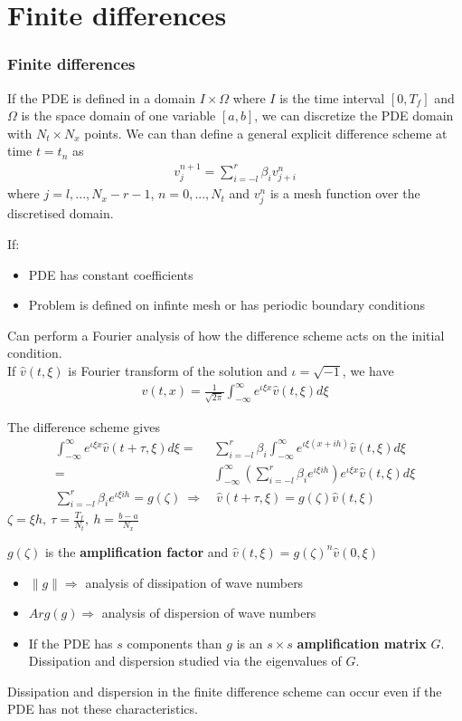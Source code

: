 \documentclass{beamer}
\begin{document}
\section{Finite differences}
\begin{frame}
\frametitle{Finite differences}
If the PDE is defined in a domain $I \times \Omega$ where $I$ is the time interval $[0, T_f]$ and $\Omega$ is the space domain of one variable $[a,b]$, we can discretize the PDE domain with $N_t \times N_x$ points. We can than define a general explicit difference scheme at time $t = t_n$ as
\begin{align*}
v_j^{n+1} = \sum_{i = -l}^r \beta_i v_{j+i}^n
\end{align*}
where $j = l, ..., N_x - r -1$, $n = 0, ..., N_t$ and $v_j^n$ is a mesh function over the discretised domain.
\end{frame}
\begin{frame}
If: \begin{itemize}
\item PDE has constant coefficients
\item Problem is defined on infinte mesh or has periodic boundary conditions
\end{itemize}
Can perform a Fourier analysis of how the difference scheme acts on the initial condition. \\ If $\hat{v}(t,\xi)$ is Fourier transform of the solution and $\iota = \sqrt{-1}$, we have
\begin{align*}
v(t,x) = \frac{1}{\sqrt{2\pi}}\int_{-\infty}^{\infty}e^{\iota\xi x}\hat{v}(t,\xi)d\xi
\end{align*}
\end{frame}
\begin{frame}
The difference scheme gives
\begin{align*}
\int_{-\infty}^{\infty}e^{\iota\xi x}\hat{v}(t + \tau,\xi)d\xi = & \sum_{i=-l}^{r}\beta_i\int_{-\infty}^{\infty}e^{\iota\xi (x + ih)}\hat{v}(t,\xi)d\xi \\
= & \int_{-\infty}^{\infty} \left(\sum_{i=-l}^{r}\beta_i e^{\iota\xi ih}\right) e^{\iota \xi x}\hat{v}(t,\xi)d\xi \\
\sum_{i=-l}^{r}\beta_i e^{\iota\xi ih} = g(\zeta) \ \Rightarrow & \ \hat{v}(t + \tau, \xi) = g(\zeta)\hat{v}(t,\xi)
\end{align*}
$\zeta = \xi h, \ \tau = \frac{T_f}{N_t}, \ h = \frac{b - a}{N_x}$
\end{frame}
\begin{frame}
$g(\zeta)$ is the \textbf{amplification factor} and $\hat{v}(t,\xi) = g(\zeta)^n\hat{v}(0,\xi)$
\begin{itemize}
\setlength\itemsep{1em}
\item $\|g\| \Rightarrow$ analysis of dissipation of wave numbers
\item $Arg(g) \Rightarrow$ analysis of dispersion of wave numbers
\item If the PDE has $s$ components than $g$ is an $s \times s$ \textbf{amplification matrix} $G$. Dissipation and dispersion studied via the eigenvalues of $G$.
\end{itemize}
Dissipation and dispersion in the finite difference scheme can occur even if the PDE has not these characteristics.
\end{frame}
\end{document}

